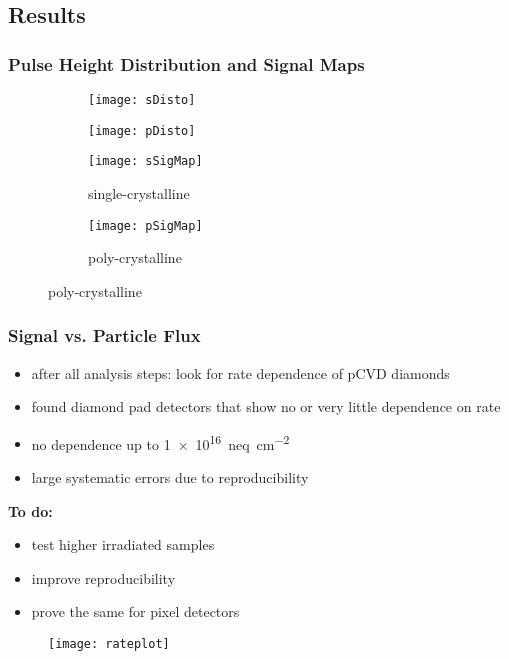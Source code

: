 \subsection{Results}
\begin{frame}
	\frametitle{Pulse Height Distribution and Signal Maps}
	\vspace*{-7.5pt}
	\def \sp {0.62\textwidth}
	\begin{figure}
		\centering
		\begin{subfigure}{0.45\textwidth} 
			\centering 
			\texttt{[image: sDisto]}
		\end{subfigure}
		\begin{subfigure}{0.45\textwidth} 
			\centering 
			\texttt{[image: pDisto]}
		\end{subfigure}
	\end{figure}
	\vspace*{-15pt}
	\begin{figure}
	\centering
		\begin{subfigure}{0.45\textwidth} 
			\centering 
			\texttt{[image: sSigMap]}
			\caption{single-crystalline}
		\end{subfigure}
		\begin{subfigure}{0.45\textwidth} 
			\centering 
			\texttt{[image: pSigMap]}
			\caption{poly-crystalline}
		\end{subfigure} 
	\end{figure}
\end{frame}
\begin{frame}
	\frametitle{Signal vs. Particle Flux}
	\begin{minipage}[c][.75\textheight]{.5\textwidth}
		\begin{itemize}
			\setlength{\itemsep}{\fill}
			\item after all analysis steps: look for rate dependence of pCVD diamonds
			\item found diamond pad detectors that show no or very little dependence on rate
			\item no dependence up to \SI{1e16}{neq\per cm^2}
			\item large systematic errors due to reproducibility
		\end{itemize}
		\vspace*{3pt}
		\textbf{To do:}
		\begin{itemize}
			\setlength{\itemsep}{\fill}
			\item test higher irradiated samples
			\item improve reproducibility
			\item prove the same for pixel detectors
		\end{itemize}
	\end{minipage}
	\hspace*{5pt}
	\begin{minipage}{.45\textwidth}
		\begin{figure}
			\centering
			\texttt{[image: rateplot]}
		\end{figure}
	\end{minipage}
\end{frame}
